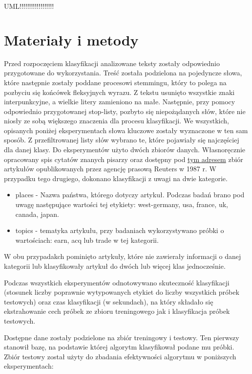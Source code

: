 \documentclass{classrep}
\begin{document}
{\color{blue} UML!!!!!!!!!!!!!!!!!!}

\section{Materiały i metody}
Przed rozpoczęciem klasyfikacji analizowane teksty zostały odpowiednio przygotowane do wykorzystania. Treść została podzielona na pojedyncze słowa, które następnie zostały poddane procesowi stemmingu, który to polega na pozbyciu się końcówek fleksyjnych wyrazu. Z tekstu usunięto wszystkie znaki interpunkcyjne, a wielkie litery zamieniono na małe. Następnie, przy pomocy odpowiednio przygotowanej stop-listy, pozbyto się niepożądanych słów, które nie niosły ze sobą większego znaczenia dla procesu klasyfikacji.
We wszystkich, opisanych poniżej eksperymentach słowa kluczowe zostały wyznaczone w ten sam sposób. Z przefiltrowanej listy słów wybrano te, które pojawiały się najczęściej dla danej klasy. 
Do eksperymentów użyto dwóch zbiorów danych. Własnoręcznie opracowany spis cytatów znanych pisarzy oraz dostępny pod \href{http://archive.ics.uci.edu/ml/datasets/Reuters-21578+Text+Categorization+Collection}{tym adresem} zbiór artykułów opublikowanych przez agencję prasową Reuters w 1987 r. W przypadku tego drugiego, dokonano klasyfikacji z uwagi na dwie kategorie.
\begin{itemize}
	\item places - Nazwa państwa, którego dotyczy artykuł. Podczas badań brano pod uwagę następujące wartości tej etykiety: west-germany, usa, france, uk, canada, japan.
	\item topics - tematyka artykułu, przy badaniach wykorzystywano próbki o wartościach: earn, acq lub trade w tej kategorii.
\end{itemize}
W obu przypadakch pominięto artykuły, które nie zawierały informacji o danej kategorii lub klasyfikowały artykuł do dwóch lub więcej klas jednocześnie.

Podczas wszystkich eksperymentów odnotowywano skuteczność klasyfikacji (stosunek liczby poprawnie wytypowanych etykiet do liczby wszystkich próbek testowych) oraz czas klasyfikacji (w sekundach), na który składało się ekstrahowanie cech próbek ze zbioru treningowego jak i klasyfikacja próbek testowych.

Dostępne dane zostały podzielone na zbiór treningowy i testowy. Ten pierwszy stanowił bazę, na podstawie której algorytm klasyfikował podane mu próbki. Zbiór testowy został użyty do zbadania efektywności algorytmu w poniższych eksperymentach:
\end{document}
